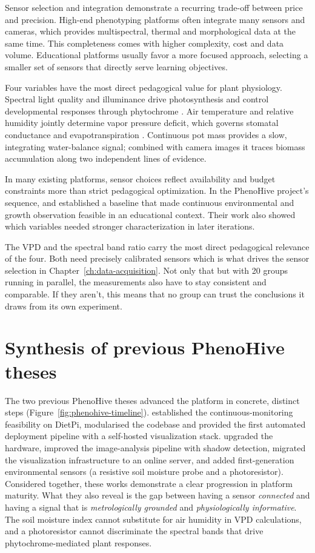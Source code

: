 Sensor selection and integration demonstrate a recurring trade-off between price and precision. High-end phenotyping platforms often integrate many sensors and cameras, which provides multispectral, thermal and morphological data at the same time. This completeness comes with higher complexity, cost and data volume. Educational platforms usually favor a more focused approach, selecting a smaller set of sensors that directly serve learning objectives.

Four variables have the most direct pedagogical value for plant physiology. Spectral light quality and illuminance drive photosynthesis and control developmental responses through phytochrome \parencite{franklin2005phytochromes}. Air temperature and relative humidity jointly determine vapor pressure deficit, which governs stomatal conductance and evapotranspiration \parencite{allen1998fao}. Continuous pot mass provides a slow, integrating water-balance signal; combined with camera images it traces biomass accumulation along two independent lines of evidence.

In many existing platforms, sensor choices reflect availability and budget constraints more than strict pedagogical optimization. In the PhenoHive project's sequence, \textcite{goffinet2024} and \textcite{colinet2025} established a baseline that made continuous environmental and growth observation feasible in an educational context. Their work also showed which variables needed stronger characterization in later iterations.

The VPD and the spectral band ratio carry the most direct pedagogical relevance of the four. Both need precisely calibrated sensors which is what drives the sensor selection in Chapter~\ref{ch:data-acquisition}. Not only that but with 20 groups running in parallel, the measurements also have to stay consistent and comparable. If they aren't, this means that no group can trust the conclusions it draws from its own experiment.

\section{Synthesis of previous PhenoHive theses}

The two previous PhenoHive theses advanced the platform in concrete, distinct steps (Figure~\ref{fig:phenohive-timeline}). \textcite{goffinet2024} established the continuous-monitoring feasibility on DietPi, modularised the codebase and provided the first automated deployment pipeline with a self-hosted visualization stack. \textcite{colinet2025} upgraded the hardware, improved the image-analysis pipeline with shadow detection, migrated the visualization infrastructure to an online server, and added first-generation environmental sensors (a resistive soil moisture probe and a photoresistor). Considered together, these works demonstrate a clear progression in platform maturity. What they also reveal is the gap between having a sensor \emph{connected} and having a signal that is \emph{metrologically grounded} and \emph{physiologically informative}. The soil moisture index cannot substitute for air humidity in VPD calculations, and a photoresistor cannot discriminate the spectral bands that drive phytochrome-mediated plant responses.

